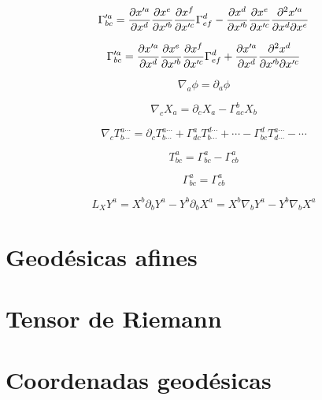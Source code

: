 \documentclass[../main]{subfiles}
\begin{document}
\begin{equation}
    \Gamma'^a_{bc}=\pdv{x'^a}{x^d} \pdv{x^e}{x'^b} \pdv{x^f}{x'^c} \Gamma_{ef}^d- \pdv{x^d}{x'^b} \pdv{x^e}{x'^c} \pdv{^2 x'^a}{x^d \partial x^e}
\end{equation}

\begin{equation}
    \Gamma'^a_{bc}=\pdv{x'^a}{x^d} \pdv{x^e}{x'^b} \pdv{x^f}{x'^c} \Gamma_{ef}^d+ \pdv{x'^a}{x^d} \pdv{^2 x^d}{x'^b \partial x'^c}
\end{equation}

\begin{equation}
    \nabla_a \phi= \partial_a \phi
\end{equation}

\begin{equation}
    \nabla_c X_a= \partial_c X_a - \Gamma^b_{ac} X_b
\end{equation}

\begin{equation}
    \nabla_c T^{a \cdots}_{b \cdots}=\partial_c T^{a \cdots}_{b \cdots}+\Gamma^a_{dc} T^{d \cdots}_{b \cdots}+\cdots- \Gamma^{d}_{bc} T^{a \cdots}_{d\cdots}- \cdots
\end{equation}

\begin{equation*}
    T^a_{bc}=\Gamma^a_{bc}-\Gamma^a_{cb}
\end{equation*}

\begin{equation}
   \Gamma^a_{bc}=\Gamma^a_{cb} 
\end{equation}

\begin{equation}
    L_X Y^a= X^b \partial_b Y^a- Y^b \partial_b X^a=X^b \nabla_b Y^a-Y^b \nabla_b X^a
\end{equation}

\section{Geodésicas afines}

\section{Tensor de Riemann}

\section{Coordenadas geodésicas}
\end{document}

